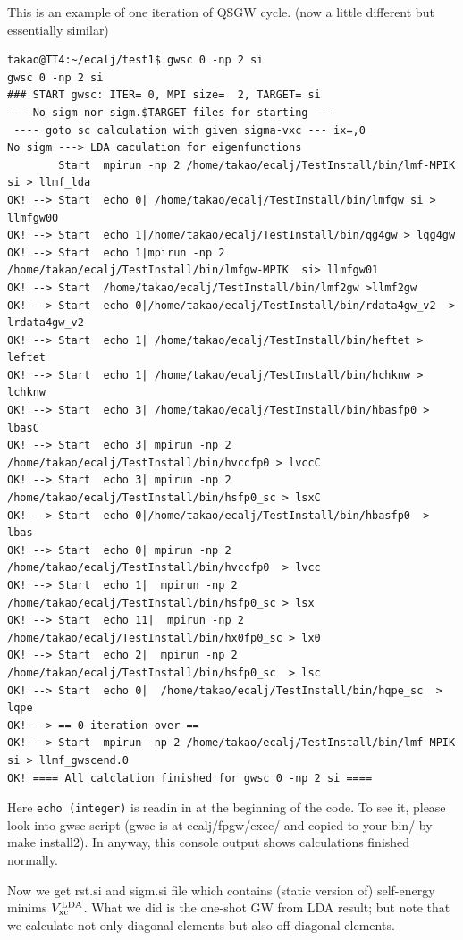 \documentclass[a4paper,10pt,epsf,fleqn]{article}
\begin{document}
This is an example of one iteration of QSGW cycle.
(now a little different but essentially similar)
\begin{verbatim}
takao@TT4:~/ecalj/test1$ gwsc 0 -np 2 si
gwsc 0 -np 2 si
### START gwsc: ITER= 0, MPI size=  2, TARGET= si
--- No sigm nor sigm.$TARGET files for starting ---
 ---- goto sc calculation with given sigma-vxc --- ix=,0
No sigm ---> LDA caculation for eigenfunctions 
        Start  mpirun -np 2 /home/takao/ecalj/TestInstall/bin/lmf-MPIK  si > llmf_lda 
OK! --> Start  echo 0| /home/takao/ecalj/TestInstall/bin/lmfgw si > llmfgw00 
OK! --> Start  echo 1|/home/takao/ecalj/TestInstall/bin/qg4gw > lqg4gw 
OK! --> Start  echo 1|mpirun -np 2 /home/takao/ecalj/TestInstall/bin/lmfgw-MPIK  si> llmfgw01 
OK! --> Start  /home/takao/ecalj/TestInstall/bin/lmf2gw >llmf2gw
OK! --> Start  echo 0|/home/takao/ecalj/TestInstall/bin/rdata4gw_v2  > lrdata4gw_v2 
OK! --> Start  echo 1| /home/takao/ecalj/TestInstall/bin/heftet > leftet 
OK! --> Start  echo 1| /home/takao/ecalj/TestInstall/bin/hchknw > lchknw 
OK! --> Start  echo 3| /home/takao/ecalj/TestInstall/bin/hbasfp0 > lbasC 
OK! --> Start  echo 3| mpirun -np 2 /home/takao/ecalj/TestInstall/bin/hvccfp0 > lvccC 
OK! --> Start  echo 3| mpirun -np 2 /home/takao/ecalj/TestInstall/bin/hsfp0_sc > lsxC 
OK! --> Start  echo 0|/home/takao/ecalj/TestInstall/bin/hbasfp0  > lbas 
OK! --> Start  echo 0| mpirun -np 2 /home/takao/ecalj/TestInstall/bin/hvccfp0  > lvcc 
OK! --> Start  echo 1|  mpirun -np 2 /home/takao/ecalj/TestInstall/bin/hsfp0_sc > lsx 
OK! --> Start  echo 11|  mpirun -np 2 /home/takao/ecalj/TestInstall/bin/hx0fp0_sc > lx0 
OK! --> Start  echo 2|  mpirun -np 2 /home/takao/ecalj/TestInstall/bin/hsfp0_sc  > lsc 
OK! --> Start  echo 0|  /home/takao/ecalj/TestInstall/bin/hqpe_sc  > lqpe 
OK! --> == 0 iteration over ==
OK! --> Start  mpirun -np 2 /home/takao/ecalj/TestInstall/bin/lmf-MPIK  si > llmf_gwscend.0 
OK! ==== All calclation finished for gwsc 0 -np 2 si ====
\end{verbatim}
Here \verb+echo (integer)+ is readin in at the beginning of the code.
To see it, please look into gwsc script (gwsc is at
ecalj/fpgw/exec/ and copied to your bin/ by make install2). 
In anyway, this console output shows calculations finished normally.

Now we get rst.si and sigm.si file which contains (static version of) self-energy
minims $V_{\rm xc}^{\rm LDA}$.
What we did is the one-shot GW from LDA result; but note that we
calculate not only diagonal elements but also off-diagonal elements. 
\end{document}
